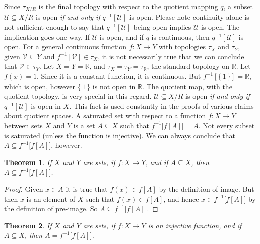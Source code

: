 \documentclass{article}
\theoremstyle{plain}
\newtheorem{theorem}{Theorem}[section]
\theoremstyle{normal}
\newenvironment{definition}{%
    \pushQED{\qed}\renewcommand{\qedsymbol}{$\blacksquare$}\definitionx%
}{%
    \popQED\enddefinitionx%
}
\begin{document}
        Since $\tau_{X/R}$ is the final topology with respect to the quotient
        mapping $q$, a subset $\mathcal{U}\subseteq{X}/R$ is open
        \textit{if and only if} $q^{-1}[\mathcal{U}]$ is open.
        Please note continuity alone is not sufficient enough to say that
        $q^{-1}[\mathcal{U}]$ being open implies $\mathcal{U}$ is open. The
        implication goes one way. If $\mathcal{U}$ is open, and if $q$ is
        continuous, then $q^{-1}[\mathcal{U}]$ is open. For a general continuous
        function $f:X\rightarrow{Y}$ with topologies $\tau_{X}$ and $\tau_{Y}$,
        given $\mathcal{V}\subseteq{Y}$ and $f^{-1}[\mathcal{V}]\in\tau_{X}$, it
        is not necessarily true that we can conclude that
        $\mathcal{V}\in\tau_{Y}$. Let $X=Y=\mathbb{R}$, and
        $\tau_{X}=\tau_{Y}=\tau_{\mathbb{R}}$, the standard topology on
        $\mathbb{R}$. Let $f(x)=1$. Since it is a constant function, it is
        continuous. But $f^{-1}[\{\,1\,\}]=\mathbb{R}$, which is open, however
        $\{\,1\,\}$ is not open in $\mathbb{R}$.
        The quotient map, with the quotient topology, is very special in this
        regard. $\mathcal{U}\subseteq{X}/R$ is open \textit{if and only if}
        $q^{-1}[\mathcal{U}]$ is open in $X$. This fact is used constantly in
        the proofs of various claims about quotient spaces.
        \begin{definition}[\textbf{Saturated Subset}]
            A saturated set with respect to a function $f:X\rightarrow{Y}$
            between sets $X$ and $Y$ is a set $A\subseteq{X}$ such that
            $f^{-1}\big[f[A]\big]=A$.
        \end{definition}
        Not every subset is saturated (unless the function is injective).
        We can always conclude that $A\subseteq{f}^{-1}\big[f[A]\big]$, however.
        \begin{theorem}
            If $X$ and $Y$ are sets, if $f:X\rightarrow{Y}$, and if
            $A\subseteq{X}$, then $A\subseteq{f}^{-1}\big[f[A]\big]$.
        \end{theorem}
        \begin{proof}
            Given $x\in{A}$ it is true that $f(x)\in{f}[A]$ by the definition
            of image. But then $x$ is an element of $X$ such that
            $f(x)\in{f}[A]$, and hence $x\in{f}^{-1}\big[f[A]\big]$ by the
            definition of pre-image. So $A\subseteq{f}^{-1}\big[f[A]\big]$.
        \end{proof}
        \begin{theorem}
            If $X$ and $Y$ are sets, if $f:X\rightarrow{Y}$ is an injective
            function, and if $A\subseteq{X}$, then $A=f^{-1}\big[f[A]\big]$.
        \end{theorem}
\end{document}
